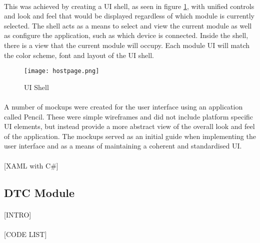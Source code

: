 	\paragraph{}{
	This was achieved by creating a UI shell, as seen in figure \ref{fig:UIShell}, with unified controls and look and feel that would be displayed regardless of which module is currently selected. The shell acts as a means to select and view the current module as well as configure the application, such as which device is connected. Inside the shell, there is a view that the current module will occupy. Each module UI will match the color scheme, font and layout of the UI shell.
	}
	
	\begin{figure}[h]
		\begin{center}
			\texttt{[image: hostpage.png]}
			\caption{UI Shell}
			\label{fig:UIShell}
		\end{center}
	\end{figure}	
	
	\paragraph{}{
	A number of mockups were created for the user interface using an application called Pencil. These were simple wireframes and did not include platform specific UI elements, but instead provide a more abstract view of the overall look and feel of the application. The mockups served as an initial guide when implementing the user interface and as a means of maintaining a coherent and standardised UI. 
	}
	\paragraph{}{
	[XAML with C\#]
	}
	
	\subsection{DTC Module}
		\paragraph{}{						
		[INTRO]
		}
		\paragraph{}{
		[CODE LIST]
		}

